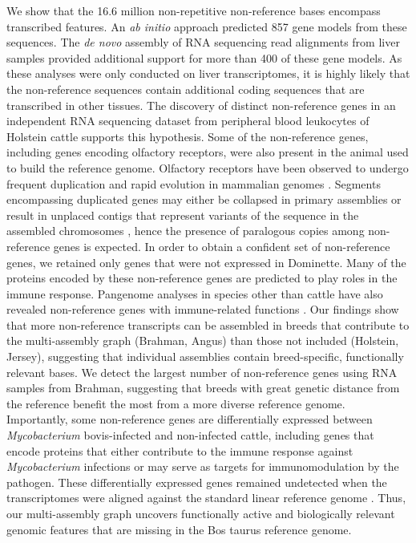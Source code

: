 \documentclass[../main.tex]{subfiles}
\begin{document}
We show that the 16.6 million non-repetitive non-reference bases encompass transcribed features. An \emph{ab initio} approach predicted 857 gene models from these sequences. The \emph{de novo} assembly of RNA sequencing read alignments from liver samples provided additional support for more than 400 of these gene models. As these analyses were only conducted on liver transcriptomes, it is highly likely that the non-reference sequences contain additional coding sequences that are transcribed in other tissues. The discovery of distinct non-reference genes in an independent RNA sequencing dataset from peripheral blood leukocytes of Holstein cattle supports this hypothesis. Some of the non-reference genes, including genes encoding olfactory receptors, were also present in the animal used to build the reference genome. Olfactory receptors have been observed to undergo frequent duplication and rapid evolution in mammalian genomes \citep{li2017comprehensive,hughes2018birth}. Segments encompassing duplicated genes may either be collapsed in primary assemblies or result in unplaced contigs that represent variants of the sequence in the assembled chromosomes \citep{vollger2019long,kelley2010detection}, hence the presence of paralogous copies among non-reference genes is expected. In order to obtain a confident set of non-reference genes, we retained only genes that were not expressed in Dominette. Many of the proteins encoded by these non-reference genes are predicted to play roles in the immune response. Pangenome analyses in species other than cattle have also revealed non-reference genes with immune-related functions \citep{li2017comprehensive,gordon2017extensive,golicz2020pangenomics}. Our findings show that more non-reference transcripts can be assembled in breeds that contribute to the multi-assembly graph (Brahman, Angus) than those not included (Holstein, Jersey), suggesting that individual assemblies contain breed-specific, functionally relevant bases. We detect the largest number of non-reference genes using RNA samples from Brahman, suggesting that breeds with great genetic distance from the reference benefit the most from a more diverse reference genome. Importantly, some non-reference genes are differentially expressed between\emph{ Mycobacterium} bovis-infected and non-infected cattle, including genes that encode proteins that either contribute to the immune response against \emph{Mycobacterium} infections or may serve as targets for immunomodulation by the pathogen. These differentially expressed genes remained undetected when the transcriptomes were aligned against the standard linear reference genome \citep{mcloughlin2014rna}. Thus, our multi-assembly graph uncovers functionally active and biologically relevant genomic features that are missing in the Bos taurus reference genome.
\end{document}
